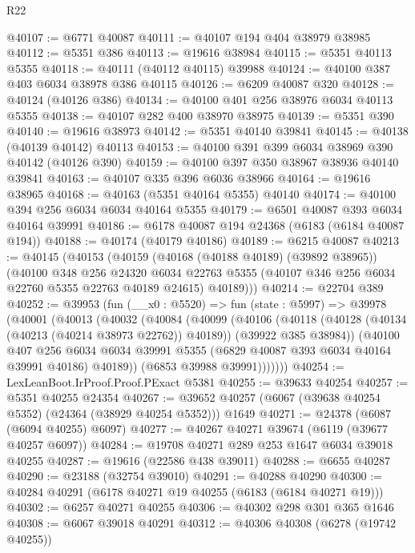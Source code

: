 \begin{lexlean}{R22}
\begin{coremodule}
@40107 := @6771 @40087
@40111 := @40107 @194 @404 @38979 @38985
@40112 := @5351 @386
@40113 := @19616 @38984
@40115 := @5351 @40113 @5355
@40118 := @40111 (@40112 @40115) @39988
@40124 := @40100 @387 @403 @6034 @38978 @386 @40115
@40126 := @6209 @40087 @320
@40128 := @40124 (@40126 @386)
@40134 := @40100 @401 @256 @38976 @6034 @40113 @5355
@40138 := @40107 @282 @400 @38970 @38975
@40139 := @5351 @390
@40140 := @19616 @38973
@40142 := @5351 @40140 @39841
@40145 := @40138 (@40139 @40142) @40113
@40153 := @40100 @391 @399 @6034 @38969 @390 @40142 (@40126 @390)
@40159 := @40100 @397 @350 @38967 @38936 @40140 @39841
@40163 := @40107 @335 @396 @6036 @38966
@40164 := @19616 @38965
@40168 := @40163 (@5351 @40164 @5355) @40140
@40174 := @40100 @394 @256 @6034 @6034 @40164 @5355
@40179 := @6501 @40087 @393 @6034 @40164 @39991
@40186 := @6178 @40087 @194 @24368 (@6183 (@6184 @40087 @194))
@40188 := @40174 (@40179 @40186)
@40189 := @6215 @40087
@40213 := @40145
    (@40153
      (@40159
        (@40168 (@40188 @40189) (@39892 @38965))
        (@40100
          @348
          @256
          @24320
          @6034
          @22763
          @5355
          (@40107 @346 @256 @6034 @22760 @5355 @22763 @40189 @24615)
          @40189)))
@40214 := @22704 @389
@40252 := @39953
    (fun (__x0 : @5520) =>
    fun (state : @5997) =>
    @39978
      (@40001
        (@40013
          (@40032
            (@40084
              (@40099
                (@40106
                  (@40118
                    (@40128 (@40134 (@40213 (@40214 @38973 @22762)) @40189))
                    (@39922 @385 @38984))
                  (@40100
                    @407
                    @256
                    @6034
                    @6034
                    @39991
                    @5355
                    (@6829 @40087 @393 @6034 @40164 @39991 @40186)
                    @40189))
                (@6853 @39988 @39991)))))))
@40254 := LexLeanBoot.IrProof.Proof.PExact @5381
@40255 := @39633 @40254
@40257 := @5351 @40255 @24354
@40267 := @39652 @40257 (@6067 (@39638 @40254 @5352) (@24364 (@38929 @40254 @5352))) @1649
@40271 := @24378 (@6087 (@6094 @40255) @6097)
@40277 := @40267 @40271 @39674 (@6119 (@39677 @40257 @6097))
@40284 := @19708 @40271 @289 @253 @1647 @6034 @39018 @40255
@40287 := @19616 (@22586 @438 @39011)
@40288 := @6655 @40287
@40290 := @23188 (@32754 @39010)
@40291 := @40288 @40290
@40300 := @40284 @40291 (@6178 @40271 @19 @40255 (@6183 (@6184 @40271 @19)))
@40302 := @6257 @40271 @40255
@40306 := @40302 @298 @301 @365 @1646
@40308 := @6067 @39018 @40291
@40312 := @40306 @40308 (@6278 (@19742 @40255))

\end{coremodule}
\end{lexlean}
